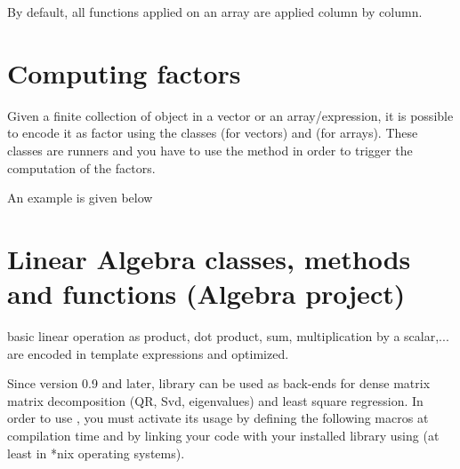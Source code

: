 \documentclass[a4paper,10pt]{article}
\begin{document}
\begin{minipage}[t]{0.66\textwidth}

\end{minipage}
\hspace{0.2cm}
\begin{minipage}[t]{0.33\textwidth}
\addtocounter{lstlisting}{-1}

\end{minipage}
\begin{note}
By default, all functions applied on an array are applied column by column.
\end{note}


\section{Computing factors}
\label{sec:factors}
Given a finite collection of object in a vector or an array/expression, it is possible to encode
it as factor using the classes  (for vectors) and 
(for arrays). These classes are runners and you have to use the 
method in order to trigger the computation of the factors.

An example is given below

\begin{minipage}[t]{0.72\textwidth}

\end{minipage}
\hspace{0.2cm}
\begin{minipage}[t]{0.27\textwidth}
\addtocounter{lstlisting}{-1}

\end{minipage}

\section{Linear Algebra classes, methods and functions (Algebra project)}
\label{sec:Algebra}

\stkpp{} basic linear operation as product, dot product, sum, multiplication
by a scalar,... are encoded in template expressions and optimized.

Since \stkpp{} version 0.9 and later, \ttcode{\lapack{}} library can be used as
back-ends for dense matrix matrix decomposition (QR, Svd, eigenvalues) and
least square regression. In order to use \lapack{}, you must activate its usage by
defining the following macros  at compilation time and
by linking your code with your installed \lapack{} library using 
(at least in *nix operating systems).
\end{document}

